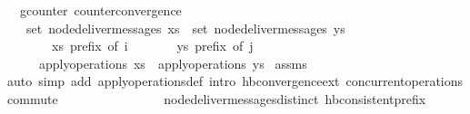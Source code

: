 \begin{isabellebody}
\isamarkupfalse%
\ {\isacharparenleft}\ gcounter{\isacharparenright}\ counter{\isacharunderscore}convergence{\isacharcolon}\isanewline
\ \ \ {\isachardoublequoteopen}set\ {\isacharparenleft}node{\isacharunderscore}deliver{\isacharunderscore}messages\ xs{\isacharparenright}\ {\isacharequal}\ set\ {\isacharparenleft}node{\isacharunderscore}deliver{\isacharunderscore}messages\ ys{\isacharparenright}{\isachardoublequoteclose}\isanewline
\ \ \ \ \ \ \ {\isachardoublequoteopen}xs\ prefix\ of\ i{\isachardoublequoteclose}\isanewline
\ \ \ \ \ \ \ {\isachardoublequoteopen}ys\ prefix\ of\ j{\isachardoublequoteclose}\isanewline
\ \ \ \ \ {\isachardoublequoteopen}apply{\isacharunderscore}operations\ xs\ {\isacharequal}\ apply{\isacharunderscore}operations\ ys{\isachardoublequoteclose}\isanewline
%
\isadelimproof
%
\endisadelimproof
%
\isatagproof
{}\isamarkupfalse%
\ assms\ \isamarkupfalse%
{\isacharparenleft}auto\ simp\ add{\isacharcolon}\ apply{\isacharunderscore}operations{\isacharunderscore}def\ intro{\isacharcolon}\ hb{\isachardot}convergence{\isacharunderscore}ext\ concurrent{\isacharunderscore}operations{\isacharunderscore}commute\isanewline
\ \ \ \ \ \ \ \ \ \ \ \ \ \ \ \ node{\isacharunderscore}deliver{\isacharunderscore}messages{\isacharunderscore}distinct\ hb{\isacharunderscore}consistent{\isacharunderscore}prefix{\isacharparenright}%
\endisatagproof
{\isafoldproof}%
%
\isadelimproof
\isanewline
%
\endisadelimproof
\end{isabellebody}%
